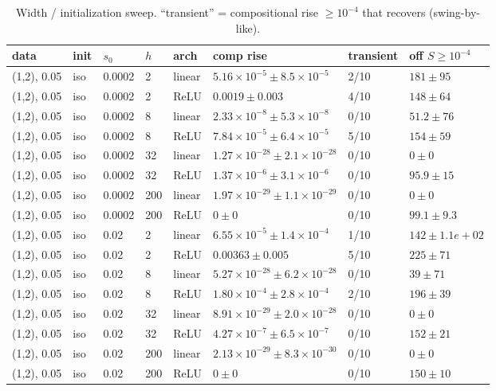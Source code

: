 \begin{table}[t]
\centering
\small
\caption{Width / initialization sweep. ``transient'' = compositional rise $\ge10^{-4}$ that recovers (swing-by-like).}
\label{tab:E3_regime}
\begin{tabular}{llllllll}
\toprule
data & init & $s_0$ & $h$ & arch & comp rise & transient & off $S{\ge}10^{-4}$ \\
\midrule
(1,2), 0.05 & iso & 0.0002 & 2 & linear & $5.16\times10^{-5}\pm8.5\times10^{-5}$ & 2/10 & $181\pm95$ \\
(1,2), 0.05 & iso & 0.0002 & 2 & ReLU & $0.0019\pm0.003$ & 4/10 & $148\pm64$ \\
(1,2), 0.05 & iso & 0.0002 & 8 & linear & $2.33\times10^{-8}\pm5.3\times10^{-8}$ & 0/10 & $51.2\pm76$ \\
(1,2), 0.05 & iso & 0.0002 & 8 & ReLU & $7.84\times10^{-5}\pm6.4\times10^{-5}$ & 5/10 & $154\pm59$ \\
(1,2), 0.05 & iso & 0.0002 & 32 & linear & $1.27\times10^{-28}\pm2.1\times10^{-28}$ & 0/10 & $0\pm0$ \\
(1,2), 0.05 & iso & 0.0002 & 32 & ReLU & $1.37\times10^{-6}\pm3.1\times10^{-6}$ & 0/10 & $95.9\pm15$ \\
(1,2), 0.05 & iso & 0.0002 & 200 & linear & $1.97\times10^{-29}\pm1.1\times10^{-29}$ & 0/10 & $0\pm0$ \\
(1,2), 0.05 & iso & 0.0002 & 200 & ReLU & $0\pm0$ & 0/10 & $99.1\pm9.3$ \\
(1,2), 0.05 & iso & 0.02 & 2 & linear & $6.55\times10^{-5}\pm1.4\times10^{-4}$ & 1/10 & $142\pm1.1e+02$ \\
(1,2), 0.05 & iso & 0.02 & 2 & ReLU & $0.00363\pm0.005$ & 5/10 & $225\pm71$ \\
(1,2), 0.05 & iso & 0.02 & 8 & linear & $5.27\times10^{-28}\pm6.2\times10^{-28}$ & 0/10 & $39\pm71$ \\
(1,2), 0.05 & iso & 0.02 & 8 & ReLU & $1.80\times10^{-4}\pm2.8\times10^{-4}$ & 2/10 & $196\pm39$ \\
(1,2), 0.05 & iso & 0.02 & 32 & linear & $8.91\times10^{-29}\pm2.0\times10^{-28}$ & 0/10 & $0\pm0$ \\
(1,2), 0.05 & iso & 0.02 & 32 & ReLU & $4.27\times10^{-7}\pm6.5\times10^{-7}$ & 0/10 & $152\pm21$ \\
(1,2), 0.05 & iso & 0.02 & 200 & linear & $2.13\times10^{-29}\pm8.3\times10^{-30}$ & 0/10 & $0\pm0$ \\
(1,2), 0.05 & iso & 0.02 & 200 & ReLU & $0\pm0$ & 0/10 & $150\pm10$ \\

\end{tabular}
\end{table}
